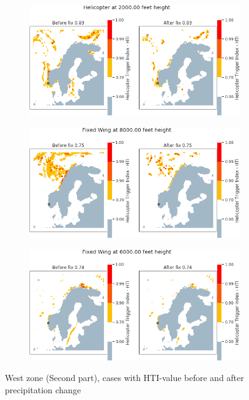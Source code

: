 \begin{figure}[H]
    \begin{subfigure}{0.45\textwidth}
    \centering
    \includegraphics[width=\textwidth]{Figures/28.png}
    \caption{}
    \label{fig:HTI28}
    \end{subfigure}
\hfill
    \begin{subfigure}{0.45\textwidth}
    \centering
    \includegraphics[width=\textwidth]{Figures/32.png}
    \caption{}
    \label{fig:HTI32}
    \end{subfigure}
\centering
    \begin{subfigure}{0.45\textwidth}
    \centering
    \includegraphics[width=\textwidth]{Figures/33.png}
    \caption{}
    \label{fig:HTI33}
    \end{subfigure}
\caption{West zone (Second part), cases with HTI-value before and after precipitation change}

\end{figure}

